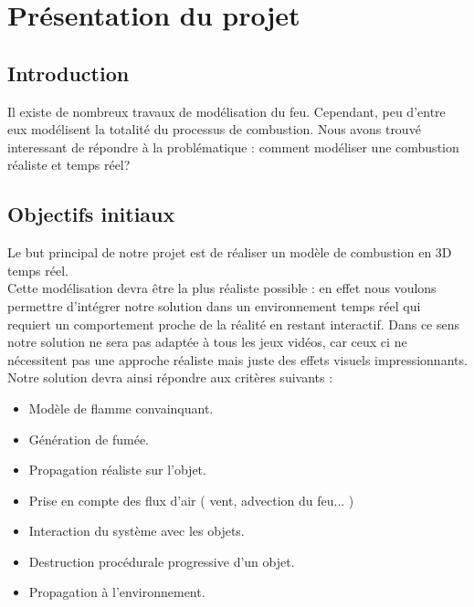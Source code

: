 \documentclass[a4paper,10pt]{article}
\begin{document}
\newpage

\tableofcontents

\newpage



\section{Présentation du projet}
\subsection{Introduction}
Il existe de nombreux travaux de modélisation du feu. Cependant, peu d'entre eux
modélisent la totalité du processus de combustion. Nous avons trouvé interessant
de répondre à la problématique : comment modéliser une combustion réaliste et temps réel?


\subsection{Objectifs initiaux}
Le but principal de notre projet est de réaliser un modèle de combustion en 3D temps
réel. \\
Cette modélisation devra être la plus réaliste possible : en
effet nous voulons permettre d'intégrer notre solution dans un
environnement temps réel qui requiert un comportement proche de la
réalité en restant interactif.
Dans ce sens notre solution ne sera pas adaptée à tous les jeux vidéos, car ceux ci ne nécessitent pas une
approche réaliste mais juste des effets visuels impressionnants.\\

Notre solution devra ainsi répondre aux critères suivants :
\begin{itemize}
\item Modèle de flamme convainquant. 
\item Génération de fumée.
\item Propagation réaliste sur l'objet. 
\item Prise en compte des flux d'air ( vent, advection du feu... )
\item Interaction du système avec les objets.
\item Destruction procédurale progressive d'un objet.
\item Propagation à l'environnement.\\
\end{itemize}
\end{document}

